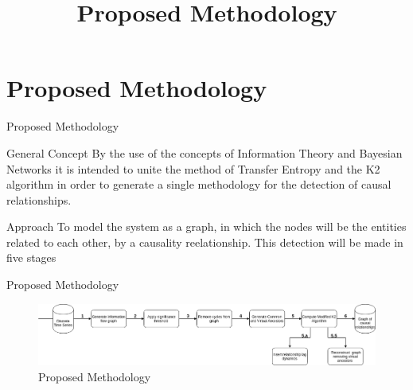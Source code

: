 \section{Proposed Methodology}
\title{Proposed Methodology}
\begin{frame}{Proposed Methodology}

	    
    	
    

    \begin{block}{General Concept}
        By the use of the concepts of Information Theory and Bayesian Networks it is intended to unite the method of Transfer Entropy and the K2 algorithm in order to generate a single methodology for the detection of causal relationships.
    \end{block}

    \begin{block}{Approach}
        To model  the system as a graph, in which the nodes will be the entities related to each other, by a causality
        reelationship. This detection will be made in five stages%
    \end{block}
\end{frame}

\begin{frame}{Proposed Methodology}
    \begin{figure}
        \includegraphics[scale=0.3]{figuras/methodology.png}
        \caption{Proposed Methodology}
    \end{figure}
\end{frame}
